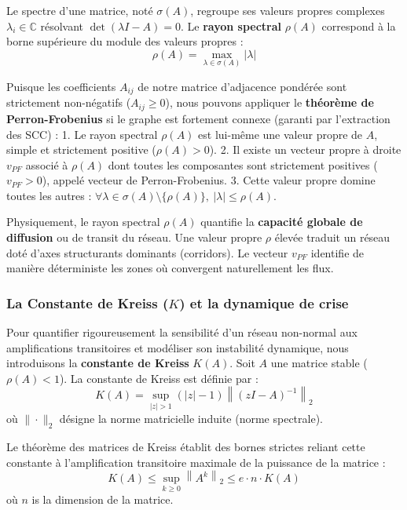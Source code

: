 \documentclass[10pt, a4paper]{article}
\begin{document}
Le spectre d'une matrice, noté \(\sigma(A)\), regroupe ses valeurs
propres complexes \(\lambda_i \in \mathbb{C}\) résolvant
\(\det(\lambda I - A) = 0\). Le \textbf{rayon spectral} \(\rho(A)\)
correspond à la borne supérieure du module des valeurs propres :
\[\rho(A) = \max_{\lambda \in \sigma(A)} |\lambda|\]

Puisque les coefficients \(A_{ij}\) de notre matrice d'adjacence
pondérée sont strictement non-négatifs (\(A_{ij} \ge 0\)), nous pouvons
appliquer le \textbf{théorème de Perron-Frobenius} si le graphe est
fortement connexe (garanti par l'extraction des SCC) : 1. Le rayon
spectral \(\rho(A)\) est lui-même une valeur propre de \(A\), simple et
strictement positive (\(\rho(A) > 0\)). 2. Il existe un vecteur propre à
droite \(v_{PF}\) associé à \(\rho(A)\) dont toutes les composantes sont
strictement positives (\(v_{PF} > 0\)), appelé vecteur de
Perron-Frobenius. 3. Cette valeur propre domine toutes les autres :
\(\forall \lambda \in \sigma(A) \setminus \{\rho(A)\}, \ |\lambda| \le \rho(A)\).

Physiquement, le rayon spectral \(\rho(A)\) quantifie la
\textbf{capacité globale de diffusion} ou de transit du réseau. Une
valeur propre \(\rho\) élevée traduit un réseau doté d'axes structurants
dominants (corridors). Le vecteur \(v_{PF}\) identifie de manière
déterministe les zones où convergent naturellement les flux.

\subsubsection{\texorpdfstring{La Constante de Kreiss (\(K\)) et la
dynamique de
crise}{La Constante de Kreiss (K) et la dynamique de crise}}\label{la-constante-de-kreiss-k-et-la-dynamique-de-crise}

Pour quantifier rigoureusement la sensibilité d'un réseau non-normal aux
amplifications transitoires et modéliser son instabilité dynamique, nous
introduisons la \textbf{constante de Kreiss} \(K(A)\). Soit \(A\) une
matrice stable (\(\rho(A) < 1\)). La constante de Kreiss est définie par
: \[K(A) = \sup_{|z| > 1} (|z| - 1) \left\| (zI - A)^{-1} \right\|_2\]
où \(\|\cdot\|_2\) désigne la norme matricielle induite (norme
spectrale).

Le théorème des matrices de Kreiss établit des bornes strictes reliant
cette constante à l'amplification transitoire maximale de la puissance
de la matrice :
\[K(A) \le \sup_{k \ge 0} \left\| A^k \right\|_2 \le e \cdot n \cdot K(A)\]
où \(n\) is la dimension de la matrice.
\end{document}
